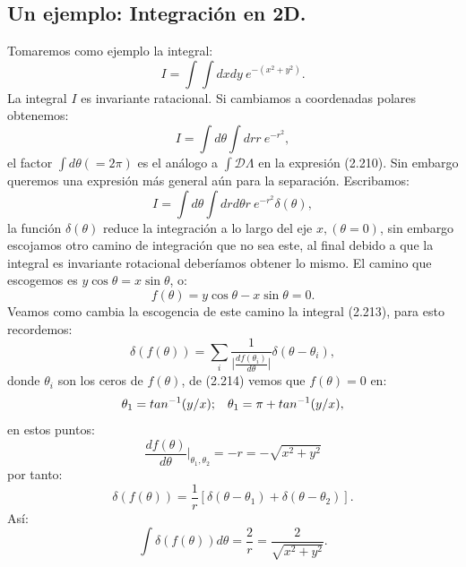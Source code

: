 \subsection{Un ejemplo: Integración en 2D.}
Tomaremos como ejemplo la integral:
\begin{equation}
I=\int \int dxdy\ e^{-(x^2+y^2)}.
\end{equation}
La integral $I$ es invariante ratacional. Si cambiamos a coordenadas polares obtenemos:
\begin{equation}
I=\int d\theta \int dr r\ e^{-r^2},
\end{equation}
el factor $\int d\theta(=2\pi)$ es el análogo a $\int\mathcal{D}\Lambda$ en la expresión (2.210). Sin embargo queremos una expresión más general aún para la separación. Escribamos:
\begin{equation}
I=\int d\theta \int drd\theta r\ e^{-r^2} \delta(\theta),
\end{equation}  
la función $\delta(\theta)$ reduce la integración a lo largo del eje $x, (\theta=0)$, sin embargo escojamos otro camino de integración que no sea este, al final debido a que la integral es invariante rotacional deberíamos obtener lo mismo. El camino que escogemos es $y\cos\theta=x\sin\theta$, o:
\begin{equation}
f(\theta)=y\cos\theta-x\sin\theta=0.
\end{equation}
Veamos como cambia la escogencia de este camino la integral (2.213), para esto recordemos:
\begin{equation}
\delta(f(\theta))=\sum_{i}\frac{1}{\bigg|\frac{df(\theta_{i})}{d\theta}\bigg|}\delta(\theta-\theta_{i}),
\end{equation}
donde $\theta_i$ son los ceros de $f(\theta)$, de (2.214) vemos que $f(\theta)=0$ en:
\begin{equation}
\theta_1=tan^{-1}(y/x); \hspace{0.3cm} \theta_1=\pi+tan^{-1}(y/x),
\end{equation} 
en estos puntos:
\begin{equation}
\frac{df(\theta)}{d\theta}\bigg|_{\theta_{1},\theta_{2}}=-r=-\sqrt{x^{2}+y^{2}}
\end{equation}
por tanto:
\begin{equation}
\delta(f(\theta))=\frac{1}{r}\left[\delta(\theta-\theta_{1})+\delta(\theta-\theta_{2})\right].
\end{equation}
Así:
\begin{equation}
\int\delta(f(\theta))d\theta=\frac{2}{r}=\frac{2}{\sqrt{x^{2}+y^{2}}}.
\end{equation}
